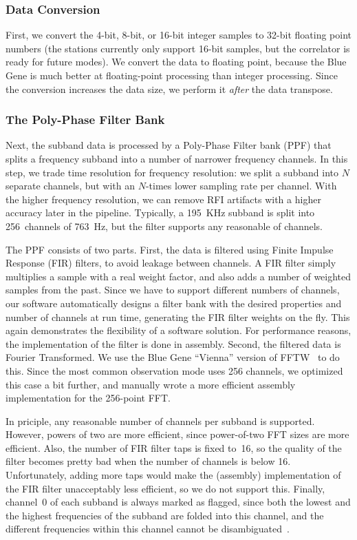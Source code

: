 \subsubsection{Data Conversion}

First, we convert the 4-bit, 8-bit, or 16-bit integer samples to 32-bit
floating point numbers (the stations currently only support 16-bit samples,
but the correlator is ready for future modes).
We convert the data to floating point, because the Blue Gene is much better at
floating-point processing than integer processing.
Since the conversion increases the data size, we perform it \emph{after\/} the
data transpose.


\subsubsection{The Poly-Phase Filter Bank}

Next, the subband data is processed by a Poly-Phase Filter bank (PPF) that
splits a frequency subband into a number of narrower frequency channels.
In this step, we trade time resolution for frequency resolution: we split a
subband into $N$ separate channels, but with an $N$-times lower sampling rate
per channel.
With the higher frequency resolution, we can remove RFI artifacts with a
higher accuracy later in the pipeline.
Typically, a 195~KHz subband is split into 256~channels of 763~Hz, but the
filter supports any reasonable of channels.

The PPF consists of two parts.
First, the data is filtered using Finite Impulse Response (FIR) filters,
to avoid leakage between channels.
A FIR filter simply multiplies a sample with a real weight factor, and
also adds a number of weighted samples from the past.
Since we have to support different numbers of channels, our software
automatically designs a filter bank with the desired properties and number
of channels at run time, generating the FIR filter weights on the fly.
This again demonstrates the flexibility of a software solution.
For performance reasons, the implementation of the filter is done in assembly.
Second, the filtered data is Fourier Transformed. We use the Blue
Gene ``Vienna'' version of FFTW~\cite{Lorenz:05} to do this.
Since the most common observation mode uses 256 channels, we optimized this
case a bit further, and manually wrote a more efficient assembly
implementation for the 256-point FFT.

In priciple, any reasonable number of channels per subband is supported.
However, powers of two are more efficient, since power-of-two FFT sizes
are more efficient.
Also, the number of FIR filter taps is fixed to~16, so the quality of the
filter becomes pretty bad when the number of channels is below 16.
Unfortunately, adding more taps would make the (assembly) implementation
of the FIR filter unacceptably less efficient, so we do not support this.
Finally, channel~0 of each subband is always marked as flagged, since both
the lowest and the highest frequencies of the subband are folded into this
channel, and the different frequencies within this channel cannot be
disambiguated~\cite{Romein:08}.

